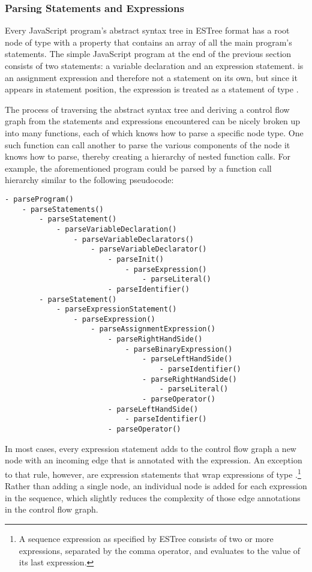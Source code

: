 \subsubsection{Parsing Statements and Expressions}

Every JavaScript program's abstract syntax tree in ESTree format has a root node of type  with a  property that contains an array of all the main program's statements. The simple JavaScript program at the end of the previous section consists of two statements: a variable declaration and an expression statement.  is an assignment expression and therefore not a statement on its own, but since it appears in statement position, the expression is treated as a statement of type .

The process of traversing the abstract syntax tree and deriving a control flow graph from the statements and expressions encountered can be nicely broken up into many functions, each of which knows how to parse a specific node type. One such function can call another to parse the various components of the node it knows how to parse, thereby creating a hierarchy of nested function calls. For example, the aforementioned program could be parsed by a function call hierarchy similar to the following pseudocode:

\begin{Verbatim}[xleftmargin=0.5cm]
- parseProgram()
    - parseStatements()
        - parseStatement()
            - parseVariableDeclaration()
                - parseVariableDeclarators()
                    - parseVariableDeclarator()
                        - parseInit()
                            - parseExpression()
                                - parseLiteral()
                        - parseIdentifier()
        - parseStatement()
            - parseExpressionStatement()
                - parseExpression()
                    - parseAssignmentExpression()
                        - parseRightHandSide()
                            - parseBinaryExpression()
                                - parseLeftHandSide()
                                    - parseIdentifier()
                                - parseRightHandSide()
                                    - parseLiteral()
                                - parseOperator()
                        - parseLeftHandSide()
                            - parseIdentifier()
                        - parseOperator()
\end{Verbatim}

In most cases, every expression statement adds to the control flow graph a new node with an incoming edge that is annotated with the expression. An exception to that rule, however, are expression statements that wrap expressions of type .\footnote{A sequence expression as specified by ESTree \cite{estree-spec} consists of two or more expressions, separated by the comma operator, and evaluates to the value of its last expression.} Rather than adding a single node, an individual node is added for each expression in the sequence, which slightly reduces the complexity of those edge annotations in the control flow graph.
